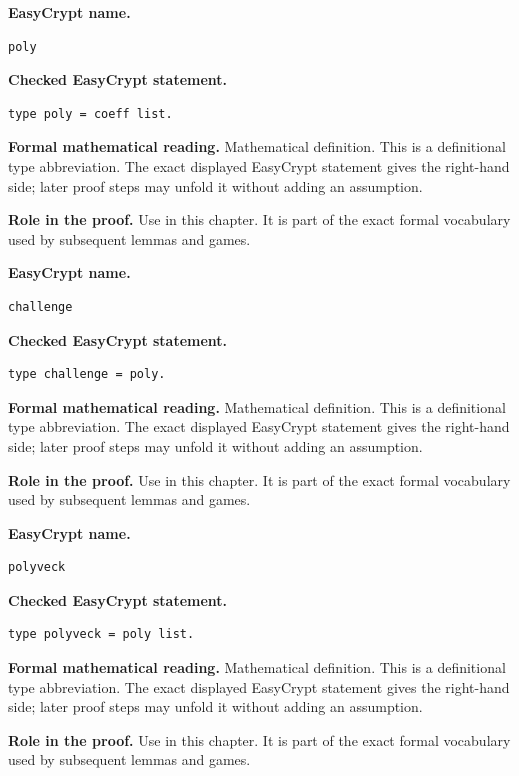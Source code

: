 \begin{formaldefinition}
\noindent\textbf{EasyCrypt name.}
\begin{lstlisting}[language=EasyCrypt,basicstyle=\ttfamily\scriptsize]
poly
\end{lstlisting}
\noindent\textbf{Checked EasyCrypt statement.}
\begin{lstlisting}[language=EasyCrypt,basicstyle=\ttfamily\scriptsize]
type poly = coeff list.
\end{lstlisting}
\noindent\textbf{Formal mathematical reading.}
Mathematical definition. This is a definitional type abbreviation.  The exact displayed EasyCrypt statement gives the right-hand side; later proof steps may unfold it without adding an assumption.

\noindent\textbf{Role in the proof.}
Use in this chapter. It is part of the exact formal vocabulary used by subsequent lemmas and games.

\end{formaldefinition}

\begin{formaldefinition}
\noindent\textbf{EasyCrypt name.}
\begin{lstlisting}[language=EasyCrypt,basicstyle=\ttfamily\scriptsize]
challenge
\end{lstlisting}
\noindent\textbf{Checked EasyCrypt statement.}
\begin{lstlisting}[language=EasyCrypt,basicstyle=\ttfamily\scriptsize]
type challenge = poly.
\end{lstlisting}
\noindent\textbf{Formal mathematical reading.}
Mathematical definition. This is a definitional type abbreviation.  The exact displayed EasyCrypt statement gives the right-hand side; later proof steps may unfold it without adding an assumption.

\noindent\textbf{Role in the proof.}
Use in this chapter. It is part of the exact formal vocabulary used by subsequent lemmas and games.

\end{formaldefinition}

\begin{formaldefinition}
\noindent\textbf{EasyCrypt name.}
\begin{lstlisting}[language=EasyCrypt,basicstyle=\ttfamily\scriptsize]
polyveck
\end{lstlisting}
\noindent\textbf{Checked EasyCrypt statement.}
\begin{lstlisting}[language=EasyCrypt,basicstyle=\ttfamily\scriptsize]
type polyveck = poly list.
\end{lstlisting}
\noindent\textbf{Formal mathematical reading.}
Mathematical definition. This is a definitional type abbreviation.  The exact displayed EasyCrypt statement gives the right-hand side; later proof steps may unfold it without adding an assumption.

\noindent\textbf{Role in the proof.}
Use in this chapter. It is part of the exact formal vocabulary used by subsequent lemmas and games.

\end{formaldefinition}

